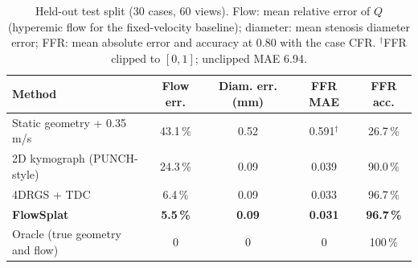 \begin{table}[t]
\centering
\small
\caption{Held-out test split (30 cases, 60 views). Flow: mean relative
error of $Q$ (hyperemic flow for the fixed-velocity baseline); diameter:
mean stenosis diameter error; FFR: mean absolute error and accuracy at
0.80 with the case CFR. $^\dagger$FFR clipped to $[0,1]$; unclipped MAE
6.94.}
\label{tab:main}
\begin{tabular}{lcccc}
\toprule
Method & Flow err. & Diam. err. (mm) & FFR MAE & FFR acc. \\
\midrule
Static geometry + 0.35\,m/s & 43.1\,\% & 0.52 & 0.591$^\dagger$ & 26.7\,\% \\
2D kymograph (PUNCH-style) & 24.3\,\% & 0.09 & 0.039 & 90.0\,\% \\
4DRGS + TDC & 6.4\,\% & 0.09 & 0.033 & 96.7\,\% \\
\textbf{FlowSplat} & \textbf{5.5\,\%} & \textbf{0.09} & \textbf{0.031} & \textbf{96.7\,\%} \\
\midrule
Oracle (true geometry and flow) & 0 & 0 & 0 & 100\,\% \\
\bottomrule
\end{tabular}
\end{table}

